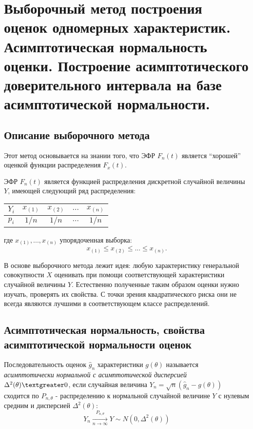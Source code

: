 \section{Выборочный метод построения оценок одномерных характеристик.
    Асимптотическая нормальность оценки. Построение асимптотического доверительного
интервала на базе асимптотической нормальности.}
\subsection{Описание выборочного метода}
Этот метод основывается на знании того, что ЭФР $F_n(t)$ является ``хорошей''
оценкой функции распределения $F_x(t)$.

ЭФР $F_n(t)$ является функцией распределения дискретной случайной величины
$Y$, имеющей следующий ряд распределения:


\begin{center}
    \begin{tabular}{ c|c|c|c|c }
        $Y_i$ & $x_{(1)}$ & $x_{(2)}$ & $...$ & $x_{(n)}$ \\
        \hline
        $p_i$ & $1/n$ & $1/n$ & $...$ & $1/n$ \\
    \end{tabular}
\end{center}

где $x_{(1)}, ..., x_{(n)}$ упорядоченная выборка:
\[
    x_{(1)} \leqslant x_{(2)} \leqslant ... \leqslant x_{(n)}
.\]

В основе выборочного метода лежит идея:
любую характеристику генеральной совокупности $X$ оценивать при помощи соответствующей характеристики случайной величины $Y$. Естественно полученные таким образом оценки нужно изучать, проверять их свойства. С точки зрения квадратического риска они не всегда являются лучшими в соответствующем классе распределений.

\subsection{Асимптотическая нормальность, свойства асимптотической нормальности оценок}

\begin{definition}
    Последовательность оценок $\hat{g}_n$ характеристики $g(\theta)$ называется
    \textit{асимптотически нормальной с асимптотической дисперсией} 
    $\Delta^2(\theta) 
    \textgreater 0$, если случайная величина $Y_n = \sqrt{n}(\hat{g}_n - 
    g(\theta))$ сходится по $P_{n, \theta}$ - распределению к нормальной 
    случайной величине $Y$ с нулевым средним и дисперсией $\Delta^2(\theta)$:
    \begin{equation}
        Y_n \xrightarrow[n \to \infty]{P_{n, \theta}} Y \sim 
        N(0, \Delta^2(\theta))\label{eq:1}
    \end{equation}
\end{definition}

